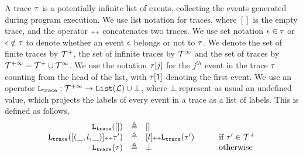 A trace $\mathtt{\tau}$ is a potentially infinite list of events, 
collecting the events generated  during program execution. 
We use list notation for traces, where $[]$ is the empty trace, and
the operator ${\scriptscriptstyle ++}$ concatenates two traces. We use set notation $\mathtt{\epsilon} \in \mathtt{\tau}$ or $\mathtt{\epsilon} \notin \mathtt{\tau}$ to denote whether an event $\mathtt{\epsilon}$ belongs or not to $\mathtt{\tau}$.
We denote the set of finite traces by $\mathcal{T}^{+}$, the set of infinite traces by $\mathcal{T}^{\infty}$ and the set of traces by $\mathcal{T}^{+\infty} = \mathcal{T}^{+} \cup \mathcal{T}^{\infty}$.
We use the notation $\mathtt{\tau}[j]$ for the $j^{th}$ event in the trace $\mathtt{\tau}$ counting from the head of the list, with $\mathtt{\tau}[1]$ denoting the first event.
We use an operator $\mathtt{L}_{\mathtt{{trace}}}: \mathcal{T}^{+\infty} \to \mathtt{List}(\mathcal{L})\cup \bot$, where $\bot$ represent as usual an undefined value, which projects the labels of every event in a trace as a list of labels. This is defined as follows,
\[
\begin{array}{rcll}
\mathtt{L}_{\mathtt{{trace}}}([]) &\triangleq & [] &\qquad  
\\ 
\mathtt{L}_{\mathtt{{trace}}}([(\_, l, \_)] {\scriptscriptstyle ++} \mathtt{\tau}') &\triangleq & [l] {\scriptscriptstyle ++} \mathtt{L}_{\mathtt{{trace}}}(\mathtt{\tau}') &\qquad  \mbox{if}\ \mathtt{\tau}'\in\mathcal{T}^{+}
\\
\mathtt{L}_{\mathtt{{trace}}}(\tau) &\triangleq & \bot  &\qquad  \mbox{otherwise}
\end{array}
\]
%
